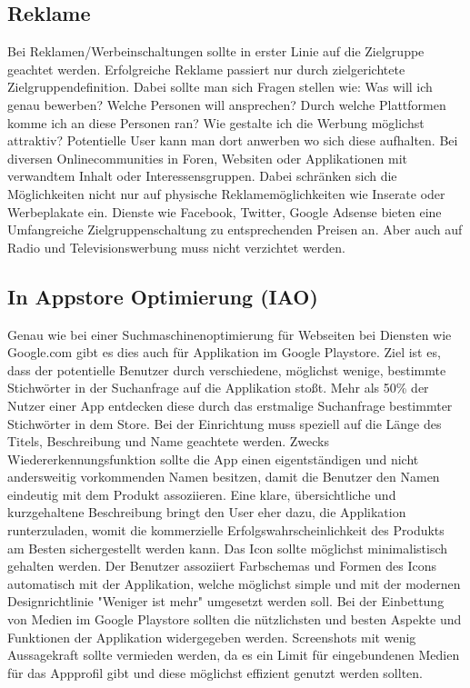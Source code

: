 \documentclass[FIPLY_base.tex]{subfiles}
\begin{document}
\subsection{Reklame}
Bei Reklamen/Werbeinschaltungen sollte in erster Linie auf die Zielgruppe geachtet werden. Erfolgreiche Reklame passiert nur durch zielgerichtete Zielgruppendefinition. Dabei sollte man sich Fragen stellen wie: Was will ich genau bewerben? Welche Personen will ansprechen? Durch welche Plattformen komme ich an diese Personen ran? Wie gestalte ich die Werbung möglichst attraktiv? \newline
Potentielle User kann man dort anwerben wo sich diese aufhalten. Bei diversen Onlinecommunities in Foren, Websiten oder Applikationen mit verwandtem Inhalt oder Interessensgruppen. Dabei schränken sich die Möglichkeiten nicht nur auf physische Reklamemöglichkeiten wie Inserate oder Werbeplakate ein. Dienste wie Facebook, Twitter, Google Adsense bieten eine Umfangreiche Zielgruppenschaltung zu entsprechenden Preisen an. Aber auch auf Radio und Televisionswerbung muss nicht verzichtet werden.


\subsection{In Appstore Optimierung (IAO)}
Genau wie bei einer Suchmaschinenoptimierung für Webseiten bei Diensten wie Google.com gibt es dies auch für Applikation im Google Playstore. Ziel ist es, dass der potentielle Benutzer durch verschiedene, möglichst wenige, bestimmte Stichwörter in der Suchanfrage auf die Applikation stoßt. Mehr als 50\% der Nutzer einer App entdecken diese durch das erstmalige Suchanfrage bestimmter Stichwörter in dem Store.
\newline
Bei der Einrichtung muss speziell auf die Länge des Titels, Beschreibung und Name geachtete werden. Zwecks Wiedererkennungsfunktion sollte die App einen eigentständigen und nicht andersweitig vorkommenden Namen besitzen, damit die Benutzer den Namen eindeutig mit dem Produkt assoziieren. Eine klare, übersichtliche und kurzgehaltene Beschreibung bringt den User eher dazu, die Applikation runterzuladen, womit die kommerzielle Erfolgswahrscheinlichkeit des Produkts am Besten sichergestellt werden kann. 
\newline
Das Icon sollte möglichst minimalistisch gehalten werden. Der Benutzer assoziiert Farbschemas und Formen des Icons automatisch mit der Applikation, welche möglichst simple und mit der modernen Designrichtlinie "Weniger ist mehr" umgesetzt werden soll. 
\newline
Bei der Einbettung von Medien im Google Playstore sollten die nützlichsten und besten Aspekte und Funktionen der Applikation widergegeben werden. Screenshots mit wenig Aussagekraft sollte vermieden werden, da es ein Limit für eingebundenen Medien für das Appprofil gibt und diese möglichst effizient genutzt werden sollten.
\end{document}
